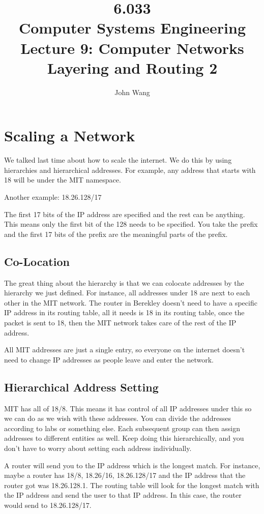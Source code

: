 \documentclass[psamsfonts]{amsart}
\title{6.033 \\
Computer Systems Engineering \\
Lecture 9: Computer Networks Layering and Routing 2}
\author{John Wang}
\begin{document}
\maketitle

\section{Scaling a Network}

We talked last time about how to scale the internet. We do this by using hierarchies and hierarchical addresses. For example, any address that starts with 18 will be under the MIT namespace.

Another example:
18.26.128/17

The first 17 bits of the IP address are specified and the rest can be anything. This means only the first bit of the 128 needs to be specified. You take the prefix and the first 17 bits of the prefix are the meaningful parts of the prefix.

\subsection{Co-Location}

The great thing about the hierarchy is that we can colocate addresses by the hierarchy we just defined. For instance, all addresses under 18 are next to each other in the MIT network. The router in Berekley doesn't need to have a specific IP address in its routing table, all it needs is 18 in its routing table, once the packet is sent to 18, then the MIT network takes care of the rest of the IP address.

All MIT addresses are just a single entry, so everyone on the internet doesn't need to change IP addresses as people leave and enter the network.

\subsection{Hierarchical Address Setting}

MIT has all of 18/8. This means it has control of all IP addresses under this so we can do as we wish with these addresses. You can divide the addresses according to labs or something else. Each subsequent group can then assign addresses to different entities as well. Keep doing this hierarchically, and you don't have to worry about setting each address individually.

A router will send you to the IP address which is the longest match. For instance, maybe a router has 18/8, 18.26/16, 18.26.128/17 and the IP address that the router got was 18.26.128.1. The routing table will look for the longest match with the IP address and send the user to that IP address. In this case, the router would send to 18.26.128/17.
\end{document}
